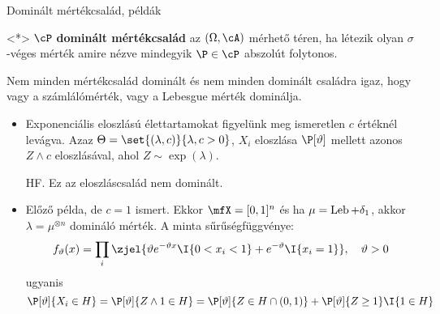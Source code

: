 \documentclass[aspectratio=169,notheorems,9pt,\option]{beamer}
\begin{document}
\begin{frame}{Dominált mértékcsalád, példák}
  \begin{df}<*>
    $\cP$ \textbf{dominált mértékcsalád} az $(\Omega,\cA)$ mérhető téren, ha létezik olyan $\sigma$-véges 
    mérték amire nézve mindegyik $\P\in\cP$ abszolút folytonos.
  \end{df}
  Nem minden mértékcsalád dominált és nem minden dominált családra igaz, 
  hogy vagy a számlálómérték, vagy a Lebesgue mérték dominálja.
  
  \begin{itemize}
    \item Exponenciális eloszlású élettartamokat figyelünk meg ismeretlen $c$ értéknél levágva. Azaz 
    $\Theta=\set{(\lambda,c)}{\lambda,c>0}$, $X_i$ eloszlása $\P[\theta]$ mellett azonos 
    $Z\wedge c$  eloszlásával, ahol $Z\sim\exp(\lambda)$.
    
    HF. Ez az eloszláscsalád nem dominált. 

    \item Előző példa, de $c=1$ ismert. Ekkor $\mfX=[0,1]^n$ és ha 
    $\mu=\operatorname{Leb}+\delta_1$, akkor $\lambda=\mu^{\otimes n}$ domináló mérték.
    A minta sűrűségfüggvénye:
    \begin{displaymath}
      f_{\theta}(x) = 
      \prod_i \zjel{\theta e^{-\theta x}\I{0<x_i<1}+e^{-\theta}\I{x_i=1}},\quad\theta>0
    \end{displaymath}
    ugyanis 
    \begin{displaymath}
      \P[\theta]{X_i\in H}=
      \P[\theta]{Z\wedge 1\in H}=
      \P[\theta]{Z\in H\cap(0,1)}+\P[\theta]{Z\geq 1}\I{1\in H}
    \end{displaymath}
  \end{itemize}
\end{frame}
\end{document}
